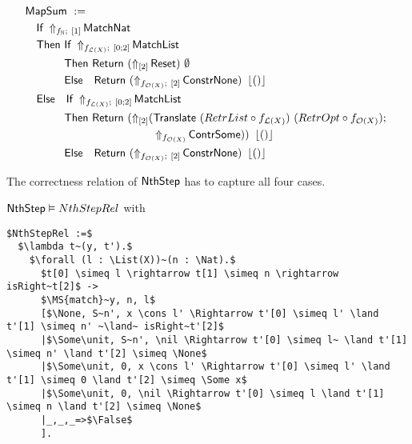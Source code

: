 \begin{definition}[$\MS{NthStep}$]
  \label{def:Nth_Step}
  ~
  \begin{align*}
    & \MS{MapSum}~:= \\
    &\quad \MS{If}~\LiftBoth{\MS{MatchNat}}{f_\Nat}{\Vector{1}} \\
    &\quad \MS{Then}~ \MS{If}~\LiftBoth{\MS{MatchList}}{f_{\List(X)}}{\Vector{0;2}} \\
    &\quad \phantom{\MS{Then}}~\MS{Then}~   \Return{(\LiftTapes{\MS{Reset}}{\Vector{2}})}{\None} \\
    &\quad \phantom{\MS{Then}}~\MS{Else}~~~ \Return{(\LiftBoth{\MS{ConstrNone}}{f_{\Option(X)}}{\Vector{2}})}{\Some\unit} \\
    &\quad \MS{Else}~~~ \MS{If}~\LiftBoth{\MS{MatchList}}{f_{\List(X)}}{\Vector{0;2}} \\
    &\quad \phantom{\MS{Then}}~\MS{Then}~   \Return{(\LiftTapes{(\MS{Translate}~(RetrList \circ f_{\List(X)})~(RetrOpt \circ f_{\Option(X)}) \Seq \\
    &\quad \phantom{\phantom{\MS{Then}}~\MS{Then}~\MS{Return}}\quad\quad~~ \LiftAlphabet{\MS{ContrSome}}{f_{\Option(X)}})}{\Vector{2}})}{\Some\unit} \\
    &\quad \phantom{\MS{Then}}~\MS{Else}~~~ \Return{(\LiftBoth{\MS{ConstrNone}}{f_{\Option(X)}}{\Vector{2}})}{\Some\unit}
  \end{align*}
\end{definition}

The correctness relation of $\MS{NthStep}$ has to capture all four cases.

\begin{lemma}
  \label{lem:Nth_Step_Realise}
  $\mathsf{NthStep} \mathrel{\vDash} NthStepRel$ with
  \small
\begin{lstlisting}[style=semicoqstyle]
$NthStepRel :=$
  $\lambda t~(y, t').$
    $\forall (l : \List(X))~(n : \Nat).$
      $t[0] \simeq l \rightarrow t[1] \simeq n \rightarrow isRight~t[2]$ ->
      $\MS{match}~y, n, l$
      [$\None, S~n', x \cons l' \Rightarrow t'[0] \simeq l' \land t'[1] \simeq n' ~\land~ isRight~t'[2]$
      |$\Some\unit, S~n', \nil \Rightarrow t'[0] \simeq l~ \land t'[1] \simeq n' \land t'[2] \simeq \None$
      |$\Some\unit, 0, x \cons l' \Rightarrow t'[0] \simeq l' \land t'[1] \simeq 0 \land t'[2] \simeq \Some x$
      |$\Some\unit, 0, \nil \Rightarrow t'[0] \simeq l \land t'[1] \simeq n \land t'[2] \simeq \None$
      |_,_,_=>$\False$
      ].
\end{lstlisting}
\end{lemma}

